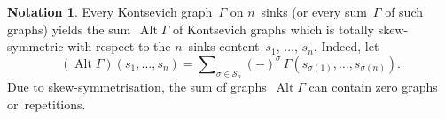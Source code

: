 \documentclass[a4paper]{jpconf}%
\theoremstyle{definition}
\newtheorem*{notation}{Notation}
\theoremstyle{remark}
\DeclareMathOperator{\Alt}{Alt}
\begin{document}
\begin{notation}%
Every Kontsevich graph~$\Gamma$ on $n$~sinks (or every sum~$\Gamma$ of such graphs) yields the sum~$\Alt\Gamma$ of Kontsevich graphs which is totally skew\/-\/symmetric with respect to the $n$~sinks content~$s_1$, $\ldots$, $s_n$. Indeed, let
\begin{equation}\label{EqMakeSkew}
(\Alt \Gamma)(s_1,\ldots,s_n) = \sum\nolimits_{\sigma\in\mathcal{S}_n} 
(-)^\sigma\, \Gamma(s_{\sigma(1)},\ldots,s_{\sigma(n)}).
\end{equation}
Due to skew\/-\/symmetrisation, the sum %
of graphs~$\Alt\Gamma$ can contain zero graphs or~\mbox{repetitions.}
\end{notation}
\end{document}
